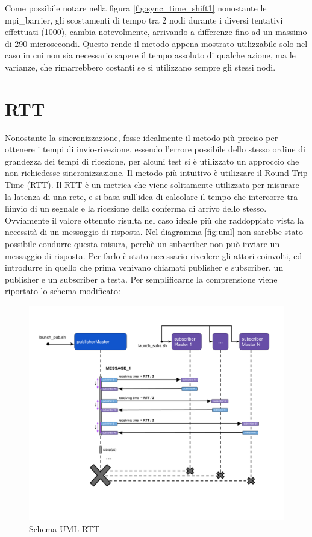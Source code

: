 Come possibile notare nella figura \ref{fig:sync_time_shift1} nonostante le mpi\_barrier, gli scostamenti di tempo tra 2 nodi durante i diversi tentativi effettuati (1000), cambia notevolmente, arrivando a differenze fino ad un massimo di 290 microsecondi. Questo rende il metodo appena mostrato utilizzabile solo nel caso in cui non sia necessario sapere il tempo assoluto di qualche azione, ma le varianze, che rimarrebbero costanti se si utilizzano sempre gli stessi nodi.


\section{RTT}\label{sec:timeRTT}
Nonostante la sincronizzazione, fosse idealmente il metodo più preciso per ottenere i tempi di invio-rivezione, essendo l'errore possibile dello stesso ordine di grandezza dei tempi di ricezione, per alcuni test si è utilizzato un approccio che non richiedesse sincronizzazione. Il metodo più intuitivo è utilizzare il Round Trip Time (RTT).
Il RTT è un metrica che viene solitamente utilizzata per misurare la latenza di una rete, e si basa sull'idea di calcolare il tempo che intercorre tra lìinvio di un segnale e la ricezione della conferma di arrivo dello stesso. Ovviamente il valore ottenuto risulta nel caso ideale più che raddoppiato vista la necessità di un messaggio di risposta. Nel diagramma \ref{fig:uml} non sarebbe stato possibile condurre questa misura, perchè un subscriber non può inviare un messaggio di risposta.
Per farlo è stato necessario rivedere gli attori coinvolti, ed introdurre in quello che prima venivano chiamati publisher e subscriber, un publisher e un subscriber a testa.
Per semplificarne la comprensione viene riportato lo schema modificato:

\begin{figure}[H]
    \includegraphics[width=\textwidth]{./img/RTT.png}
    \caption{Schema UML RTT}
    \label{fig:rtt_uml}
\end{figure} 

